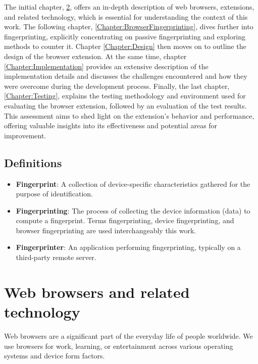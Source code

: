 The initial chapter, \ref{Chapter:Browsers}, offers an in-depth description of web browsers, extensions, and related technology, which is essential for understanding the context of this work. The following chapter, \ref{Chapter:BrowserFingerprinting}, dives further into fingerprinting, explicitly concentrating on passive fingerprinting and exploring methods to counter it. Chapter \ref{Chapter:Design} then moves on to outline the design of the browser extension. At the same time, chapter \ref{Chapter:Implementation} provides an extensive description of the implementation details and discusses the challenges encountered and how they were overcome during the development process. Finally, the last chapter, \ref{Chapter:Testing}, explains the testing methodology and environment used for evaluating the browser extension, followed by an evaluation of the test results. This assessment aims to shed light on the extension's behavior and performance, offering valuable insights into its effectiveness and potential areas for improvement.

\section{Definitions}

\begin{itemize}
	\item \textbf{Fingerprint}: A collection of device-specific characteristics gathered for the purpose of identification.
	\item \textbf{Fingerprinting}: The process of collecting the device information (data) to compute a fingerprint. Terms fingerprinting, device fingerprinting, and browser fingerprinting are used interchangeably this work.
	\item \textbf{Fingerprinter}: An application performing fingerprinting, typically on a third-party remote server.
\end{itemize}


\chapter{Web browsers and related technology}
\label{Chapter:Browsers}

Web browsers are a significant part of the everyday life of people worldwide. We use browsers for work, learning, or entertainment across various operating systems and device form factors.


